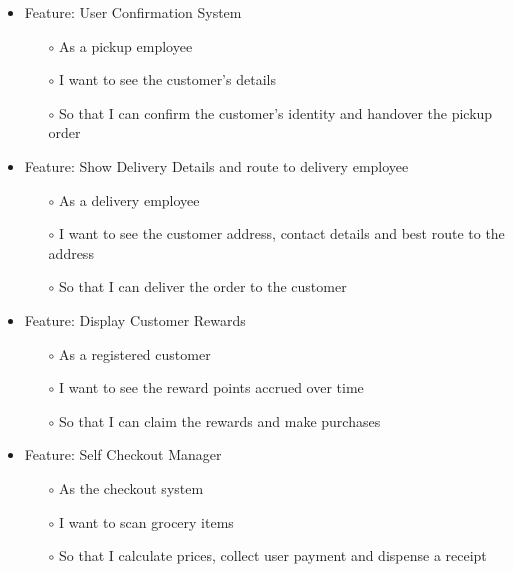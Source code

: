 \documentclass{scrreprt}
\theoremstyle{funreq}
\begin{document}
	\begin{itemize}
		\item Feature: User Confirmation System
		\begin{itemize}
			\item[$\circ$]As a pickup employee
			\item[$\circ$]I want to see the customer’s details 
			\item[$\circ$]So that I can confirm the customer’s identity and handover the pickup order
		\end{itemize}
	\end{itemize}
	
	\begin{itemize}
		\item Feature: Show Delivery Details and route to delivery employee
		\begin{itemize}
			\item[$\circ$]As a delivery employee
			\item[$\circ$]I want to see the customer address, contact details and best route to the address
			\item[$\circ$]So that I can deliver the order to the customer
		\end{itemize}
	\end{itemize}
	
	\begin{itemize}
		\item Feature: Display Customer Rewards
		\begin{itemize}
			\item[$\circ$]As a registered customer
			\item[$\circ$]I want to see the reward points accrued over time
			\item[$\circ$]So that I can claim the rewards and make purchases
		\end{itemize}
	\end{itemize}
	
	\begin{itemize}
		\item Feature: Self Checkout Manager
		\begin{itemize}
			\item[$\circ$]As the checkout system
			\item[$\circ$]I want to scan grocery items
			\item[$\circ$]So that I calculate prices, collect user payment and dispense a receipt
		\end{itemize}
	\end{itemize}
	
\end{document}
